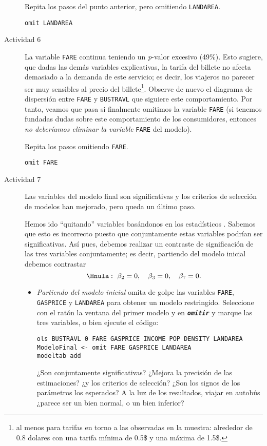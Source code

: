 \documentclass[11pt]{article}
\begin{document}
\begin{description}
Repita los pasos del punto anterior, pero omitiendo \texttt{LANDAREA}.
\begin{verbatim}
omit LANDAREA
\end{verbatim}

\item[{Actividad 6}] La variable \texttt{FARE} continua teniendo un \emph{p}-valor
excesivo (49\%). Esto sugiere, que dadas las demás variables
explicativas, la tarifa del billete no afecta demasiado a la demanda
de este servicio; es decir, los viajeros no parecer ser muy
sensibles al precio del billete\footnote{al menos para tarifas en torno a
las observadas en la muestra: alrededor de 0.8 dolares con una
tarifa mínima de 0.5\$ y una máxima de 1.5\$.}. Observe de nuevo el
diagrama de dispersión entre \texttt{FARE} y \texttt{BUSTRAVL} que siguiere este
comportamiento. Por tanto, veamos que pasa si finalmente omitimos la
variable \texttt{FARE} (si tenemos fundadas dudas sobre este comportamiento
de los consumidores, entonces \emph{no deberíamos eliminar la variable}
\texttt{FARE} del modelo).

Repita los pasos omitiendo \texttt{FARE}.
\begin{verbatim}
omit FARE 
\end{verbatim}

\item[{Actividad 7}] Las variables del modelo final son significativas y
los criterios de selección de modelos han mejorado, pero queda un
último paso.

Hemos ido ``quitando'' variables basándonos en los estadísticos
\Testadistico. Sabemos que esto es incorrecto puesto que
conjuntamente estas variables podrían ser significativas. Así pues,
debemos realizar un contraste de significación de las tres variables
conjuntamente; es decir, partiendo del modelo inicial debemos
contrastar
\begin{displaymath}
  \Hnula:\ \beta_2=0,\quad \beta_3=0,\quad \beta_7=0.
\end{displaymath}

\begin{itemize}
\item \emph{Partiendo del modelo inicial} omita de golpe las variables
\texttt{FARE}, \texttt{GASPRICE} y \texttt{LANDAREA} para obtener un modelo
restringido. Seleccione con el ratón la ventana del primer modelo
y en \textbf{\emph{\texttt{omitir}}} y marque las tres variables, o bien ejecute el
código:
\begin{verbatim}
ols BUSTRAVL 0 FARE GASPRICE INCOME POP DENSITY LANDAREA
ModeloFinal <- omit FARE GASPRICE LANDAREA
modeltab add
\end{verbatim}
¿Son conjuntamente significativas? ¿Mejora la precisión de las
estimaciones? ¿y los criterios de selección? ¿Son los signos de
los parámetros los esperados? A la luz de los resultados, viajar
en autobús ¿parece ser un bien normal, o un bien inferior?
\end{itemize}


\end{description}
\end{document}
